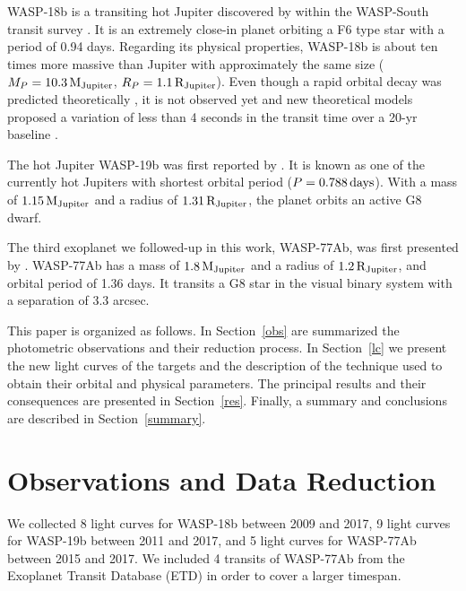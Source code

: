WASP-18b is a transiting hot Jupiter discovered by \citet{Hellier2009} within the WASP-South transit survey \citep{Pollacco2006}. It is an extremely close-in planet orbiting a F6 type star with a period of 0.94 days. Regarding its physical properties, WASP-18b is about ten times more massive than Jupiter with approximately the same size ($M_{P}=10.3\,{\rm M_{Jupiter}}$, $R_{P}=1.1\,{\rm R_{Jupiter}}$). Even though a rapid orbital decay was predicted theoretically \citep{Hellier2009}, it is not observed yet \citep{Wilkins2017} and new theoretical models proposed a variation of less than 4 seconds in the transit time over a 20-yr baseline \citep{CollierCameron2018}.

The hot Jupiter WASP-19b was first reported by \cite{Hebb2010}. It is known as one of the currently hot Jupiters with shortest orbital period ($P=0.788\,{\rm days}$). With a mass of $1.15\,{\rm M_{Jupiter}}$ and a radius of $1.31\,{\rm R_{Jupiter}}$, the planet orbits an active G8 dwarf.

The third exoplanet we followed-up in this work, WASP-77Ab, was first presented by \cite{Maxted2013}. WASP-77Ab has a mass of $1.8\,{\rm M_{Jupiter}}$ and a radius of $1.2\,{\rm R_{Jupiter}}$, and orbital period of 1.36 days. It transits a G8 star in the visual binary system with a separation of 3.3 arcsec.

This paper is organized as follows. In Section~\ref{obs} are summarized the photometric observations and their reduction process. In Section~\ref{lc} we present the new light curves of the targets and the description of the technique used to obtain their orbital and physical parameters. The principal results and their consequences are presented in Section~\ref{res}. Finally, a summary and conclusions are described in Section~\ref{summary}.


\section{Observations and Data Reduction}

We collected 8 light curves for WASP-18b between 2009 and 2017, 9 light curves for WASP-19b between 2011 and 2017, and 5 light curves for WASP-77Ab between 2015 and 2017. We included 4 transits of WASP-77Ab from the Exoplanet Transit Database (ETD) in order to cover a larger timespan.

